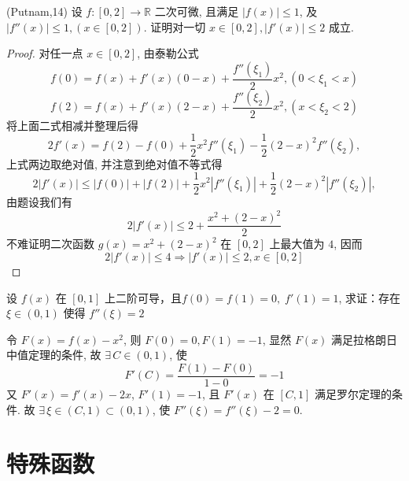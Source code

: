 \documentclass[color=green,titlestyle=hang]{elegantbook}%
\begin{document}
\begin{example}
(Putnam,14) 设 $f:[0,2]\to\mathbb{R}$ 二次可微, 且满足 $|f(x)|\leqslant1$, 及  $|f''(x)|\leqslant1, (x\in[0,2])$. 证明对一切 $x\in[0,2], |f'(x)|\leqslant2$ 成立.
\end{example}\begin{proof}
对任一点 $x\in[0,2]$, 由泰勒公式
\[f(0)=f(x)+f'(x)(0-x)+\frac{f''(\xi_1)}{2}x^2, (0<\xi_1<x)\]
\[f(2)=f(x)+f'(x)(2-x)+\frac{f''(\xi_2)}{2}x^2, (x<\xi_2<2)\]
将上面二式相减并整理后得
\[2f'(x)=f(2)-f(0)+\frac{1}{2}x^2f''(\xi_1)-\frac{1}{2}(2-x)^2f''(\xi_2),\]
上式两边取绝对值, 并注意到绝对值不等式得
\[2|f'(x)|\leqslant|f(0)|+|f(2)|+\frac{1}{2}x^2|f''(\xi_1)|+\frac{1}{2}(2-x)^2|f''(\xi_2)|,\]
由题设我们有
\[2|f'(x)|\leqslant2+\frac{x^2+(2-x)^2}{2}\]
不难证明二次函数 $g(x)=x^2+(2-x)^2$ 在 $[0,2]$ 上最大值为 $4$, 因而
\[2|f'(x)|\leqslant4\Longrightarrow |f'(x)|\leqslant2,x\in[0,2]\]
\end{proof}

\begin{example}
设 $f(x)$ 在 $[0,1]$ 上二阶可导，且$f(0)=f(1)=0,\;f'(1)=1$, 求证：存在 $\xi\in(0,1)$ 使得 $f''(\xi)=2$
\end{example}\begin{solution}
令 $F(x)=f(x)-x^2$, 则 $F(0)=0, F(1)=-1$, 显然 $F(x)$ 满足拉格朗日中值定理的条件, 故 $\exists\,C\in(0,1)$, 使 
\[F'(C)=\frac{F(1)-F(0)}{1-0}=-1\]
又 $F'(x)=f'(x)-2x$, $F'(1)=-1$,
且 $F'(x)$ 在 $[C,1]$ 满足罗尔定理的条件. 故 $\exists\,\xi\in(C,1)\subset(0,1)$, 使 $F''(\xi)=f''(\xi)-2=0$.
\end{solution}

\chapter{特殊函数}

%
\end{document}
